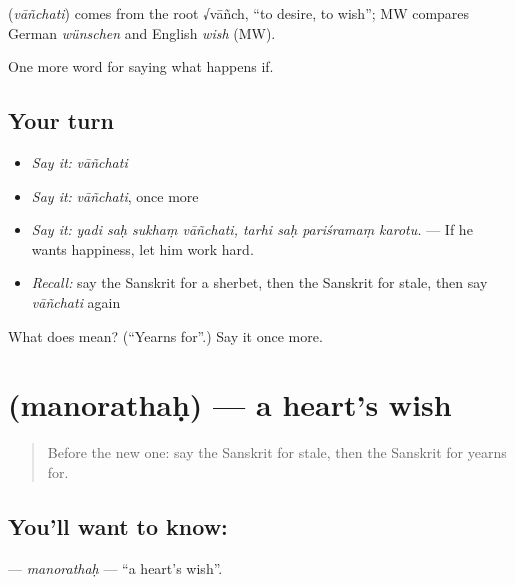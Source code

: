 \begin{cousinweb}
\textbf{} (\emph{vāñchati}) comes from the root √vāñch, \textquotedblleft{}to desire, to wish\textquotedblright{}; MW compares German \emph{wünschen} and English \emph{wish} (MW).
\end{cousinweb}

\begin{grammarlens}[title={What you've built}]
One more word for saying what happens if.
\end{grammarlens}

\subsection*{Your turn}
\begin{itemize}
\raggedright
  \item \emph{Say it:} \emph{vāñchati}
  \item \emph{Say it:} \emph{vāñchati}, once more
  \item \emph{Say it:} \emph{yadi saḥ sukhaṃ vāñchati, tarhi saḥ pariśramaṃ karotu.} — If he wants happiness, let him work hard.
  \item \emph{Recall:} say the Sanskrit for a sherbet, then the Sanskrit for stale, then say \emph{vāñchati} again
\end{itemize}

\begin{tcolorbox}[breakable,colback=teal!4,colframe=teal!35!black,title={Before you move on}]
What does  mean? (\textquotedblleft{}Yearns for\textquotedblright{}.) Say it once more.
\end{tcolorbox}
\section[\texorpdfstring{\sk{मनोरथः} (manorathaḥ)}{मनोरथः (manorathaḥ)}]{ (manorathaḥ) — a heart's wish}

\label{lesson:SA-C531-manorathah}



\begin{quote}
Before the new one: say the Sanskrit for stale, then the Sanskrit for yearns for.
\end{quote}

\subsection*{You'll want to know: }
\textbf{} — \emph{manorathaḥ} — \textquotedblleft{}a heart's wish\textquotedblright{}.


